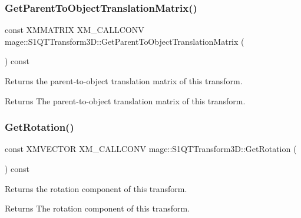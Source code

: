 \subsubsection{\texorpdfstring{Get\+Parent\+To\+Object\+Translation\+Matrix()}{GetParentToObjectTranslationMatrix()}}
{\footnotesize\ttfamily const X\+M\+M\+A\+T\+R\+IX X\+M\+\_\+\+C\+A\+L\+L\+C\+O\+NV mage\+::\+S1\+Q\+T\+Transform3\+D\+::\+Get\+Parent\+To\+Object\+Translation\+Matrix (\begin{DoxyParamCaption}{ }\end{DoxyParamCaption}) const\hspace{0.3cm}{\ttfamily [noexcept]}}

Returns the parent-\/to-\/object translation matrix of this transform.

\begin{DoxyReturn}{Returns}
The parent-\/to-\/object translation matrix of this transform. 
\end{DoxyReturn}
\mbox{\label{classmage_1_1_s1_q_t_transform3_d_a1099be1aeb8a1c6f3a7ec7be8ae03edd}} 
\subsubsection{\texorpdfstring{Get\+Rotation()}{GetRotation()}}
{\footnotesize\ttfamily const X\+M\+V\+E\+C\+T\+OR X\+M\+\_\+\+C\+A\+L\+L\+C\+O\+NV mage\+::\+S1\+Q\+T\+Transform3\+D\+::\+Get\+Rotation (\begin{DoxyParamCaption}{ }\end{DoxyParamCaption}) const\hspace{0.3cm}{\ttfamily [noexcept]}}

Returns the rotation component of this transform.

\begin{DoxyReturn}{Returns}
The rotation component of this transform. 
\end{DoxyReturn}
\mbox{\label{classmage_1_1_s1_q_t_transform3_d_a0dba405f65e9c31520b08bddb35ba40c}} 
